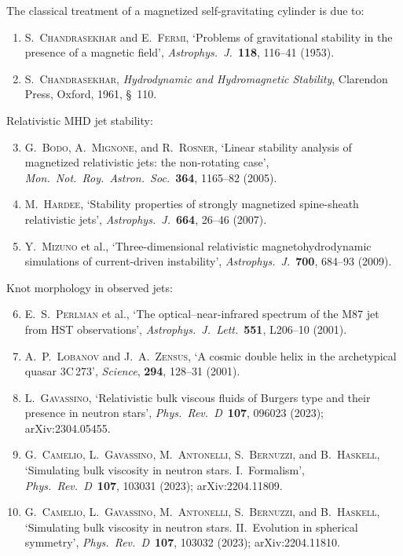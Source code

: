 The classical treatment of a magnetized self-gravitating cylinder is due
to:
\begin{enumerate}
\item S.~\textsc{Chandrasekhar} and E.~\textsc{Fermi}, `Problems of
  gravitational stability in the presence of a magnetic field',
  \emph{Astrophys.\ J.}\ \textbf{118}, 116--41 (1953).

\item S.~\textsc{Chandrasekhar}, \emph{Hydrodynamic and Hydromagnetic
  Stability}, Clarendon Press, Oxford, 1961, \S~110.
\end{enumerate}

\noindent
Relativistic MHD jet stability:
\begin{enumerate}
\setcounter{enumi}{2}
\item G.~\textsc{Bodo}, A.~\textsc{Mignone}, and
  R.~\textsc{Rosner}, `Linear stability analysis of magnetized
  relativistic jets: the non-rotating case', \emph{Mon.\ Not.\ Roy.\
  Astron.\ Soc.}\ \textbf{364}, 1165--82 (2005).

\item M.~\textsc{Hardee}, `Stability properties of strongly magnetized
  spine-sheath relativistic jets', \emph{Astrophys.\ J.}\ \textbf{664},
  26--46 (2007).

\item Y.~\textsc{Mizuno} et al., `Three-dimensional relativistic
  magnetohydrodynamic simulations of current-driven instability',
  \emph{Astrophys.\ J.}\ \textbf{700}, 684--93 (2009).
\end{enumerate}

\noindent
Knot morphology in observed jets:
\begin{enumerate}
\setcounter{enumi}{5}
\item E.~S.~\textsc{Perlman} et al., `The optical--near-infrared
  spectrum of the M87 jet from HST observations', \emph{Astrophys.\ J.\
  Lett.}\ \textbf{551}, L206--10 (2001).

\item A.~P.~\textsc{Lobanov} and J.~A.~\textsc{Zensus}, `A cosmic
  double helix in the archetypical quasar 3C\,273', \emph{Science},
  \textbf{294}, 128--31 (2001).

\item L.~\textsc{Gavassino}, `Relativistic bulk viscous fluids of
  Burgers type and their presence in neutron stars',
  \emph{Phys.\ Rev.\ D}\ \textbf{107}, 096023 (2023);
  arXiv:2304.05455.

\item G.~\textsc{Camelio}, L.~\textsc{Gavassino},
  M.~\textsc{Antonelli}, S.~\textsc{Bernuzzi}, and
  B.~\textsc{Haskell}, `Simulating bulk viscosity in neutron stars.
  I.\ Formalism', \emph{Phys.\ Rev.\ D}\ \textbf{107}, 103031
  (2023); arXiv:2204.11809.

\item G.~\textsc{Camelio}, L.~\textsc{Gavassino},
  M.~\textsc{Antonelli}, S.~\textsc{Bernuzzi}, and
  B.~\textsc{Haskell}, `Simulating bulk viscosity in neutron stars.
  II.\ Evolution in spherical symmetry', \emph{Phys.\ Rev.\ D}\
  \textbf{107}, 103032 (2023); arXiv:2204.11810.
\end{enumerate}

